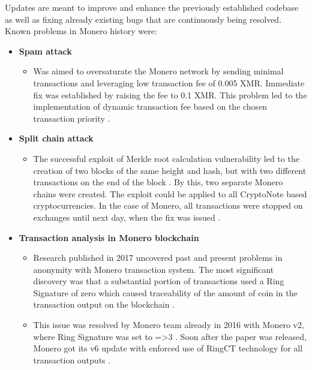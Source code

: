 \documentclass[
  printed, %
  table,   %
  lof,     %
  lot,     %
           oneside, color
]{fithesis3}
\begin{document}
Updates are meant to improve and enhance the previously established codebase as well as fixing already existing bugs that are continuously being resolved. Known problems in Monero history were:

\begin{itemize}
\item \textbf{Spam attack}
\begin{itemize}
\item Was aimed to oversaturate the Monero network by sending minimal transactions and leveraging low transaction fee of 0.005 XMR. Immediate fix was established by raising the fee to 0.1 XMR. This problem led to the implementation of dynamic transaction fee based on the chosen transaction priority \cite{monerospamattack}.
\end{itemize}
\item \textbf{Split chain attack}
\begin{itemize}
\item The successful exploit of Merkle root calculation vulnerability led to the creation of two blocks of the same height and hash, but with two different transactions on the end of the block \cite{macheta2014counterfeiting}. By this, two separate Monero chains were created. The exploit could be applied to all CryptoNote based cryptocurrencies. In the case of Monero, all transactions were stopped on exchanges until next day, when the fix was issued \cite{cryptonotemerkletree}.
\end{itemize}
\item \textbf{Transaction analysis in Monero blockchain}
\begin{itemize}
\item Research published in 2017 uncovered past and present problems in anonymity with Monero transaction system. The most significant discovery was that a substantial portion of transactions used a Ring Signature of zero which caused traceability of the amount of coin in the transaction output on the blockchain \cite{moser2018empirical}.
\item This issue was resolved by Monero team already in 2016 with Monero v2, where Ring Signature was set to =>3 \cite{monerov2release}. Soon after the paper was released, Monero got its v6 update with enforced use of RingCT technology for all transaction outputs \cite{monerov6release}.
\end{itemize}
\end{itemize}
\newpage
\end{document}
